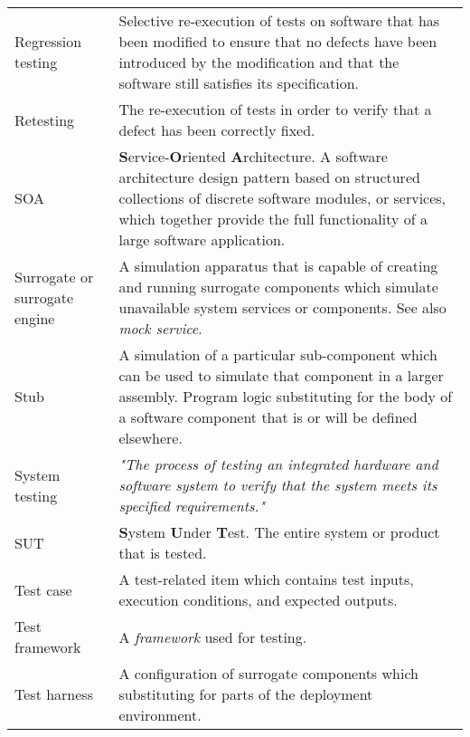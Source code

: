 \documentclass[12pt,a4paper,oneside,pdftex]{report}
\begin{document}
\begin{longtable}{@{}p{}p{}@{}}
Regression testing & Selective re-execution of tests on software that has been modified to ensure that no defects have been introduced by the modification and that the software still satisfies its specification. \citep{burnstein2003practical, ieee2010systems} \\[0.3cm]

Retesting & The re-execution of tests in order to verify that a defect has been correctly fixed. \citep{jenkins2008software} \\[0.3cm]

SOA & \textbf{S}ervice-\textbf{O}riented \textbf{A}rchitecture. A software architecture design pattern based on structured collections of discrete software modules, or services, which together provide the full functionality of a large software application. \citep{velte2009cloud} \\[0.3cm]

Surrogate or surrogate engine & A simulation apparatus that is capable of creating and running surrogate components which simulate unavailable system services or components. See also \emph{mock service}. \\[0.3cm]

Stub & A simulation of a particular sub-component which can be used to simulate that component in a larger assembly. \citep{jenkins2008software} Program logic substituting for the body of a software component that is or will be defined elsewhere. \citep{ieee2010systems} \\[0.3cm]

System testing & \emph{"The process of testing an integrated hardware and software system to verify that the system meets its specified requirements."} \citep{burnstein2003practical} \\[0.3cm]

SUT & \textbf{S}ystem \textbf{U}nder \textbf{T}est. The entire system or product that is tested. \citep{craig2002systematic} \\[0.3cm]

Test case & A test-related item which contains test inputs, execution conditions, and expected outputs. \citep{burnstein2003practical, ieee2010systems} \\[0.3cm]

Test framework & A \emph{framework} used for testing. \\[0.3cm]

Test harness & A configuration of surrogate components which substituting for parts of the deployment environment. \citep{pezze2008software} \\[0.3cm]


\end{longtable}
\end{document}

